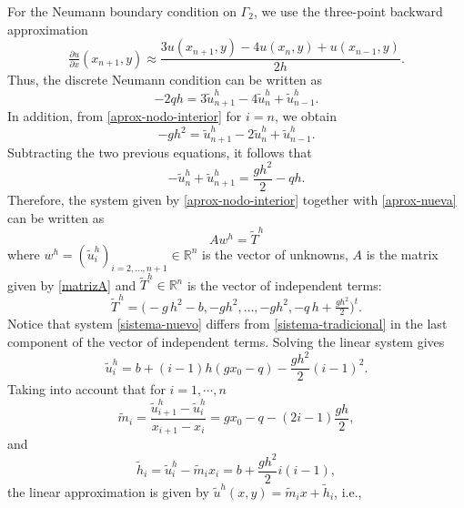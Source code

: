 \documentclass[11pt]{article}
\newcommand\pder[2][]{\ensuremath{\tfrac{\partial#1}{\partial#2}}}
\begin{document}
For the Neumann boundary condition on $\Gamma_2$, we use the three-point backward \mbox{approximation}
\begin{equation}\label{aprox-Neumann-nueva}
\pder[u]{x}(x_{n+1},y)\approx \frac{3u(x_{n+1},y)-4u(x_n,y)+u(x_{n-1},y)}{2h}.
\end{equation}
Thus, the discrete Neumann condition can be written as
\begin{equation}
-2 q h = {
3\widetilde{u}^{h}_{n+1}
-4\widetilde{u}^{h}_{n}
+\widetilde{u}^{h}_{n-1}}.
\end{equation}
In addition, from \eqref{aprox-nodo-interior} for $i=n$, we obtain
\begin{equation}
-gh^2 = {\widetilde{u}^h_{n+1}-2\widetilde{u}^h_n+\widetilde{u}^h_{n-1}.}
\end{equation}
Subtracting the two previous equations, it follows that
\begin{equation}\label{aprox-nueva}
{-\widetilde{u}^h_n+\widetilde{u}^h_{n+1}}=\frac{gh^2}{2}-qh.
\end{equation}
Therefore, the system given by \eqref{aprox-nodo-interior} together with \eqref{aprox-nueva} can be written  as
\begin{equation}\label{sistema-nuevo}
{A w^h=\widetilde{T}^h}
\end{equation}
where $w^h = ({\widetilde{u}^h_i})_{i=2,\ldots,n+1}\in\mathbb{R}^{n}$ is the vector of unknowns, $A$ is the matrix given by \eqref{matrizA} and   ${\widetilde{T}^h}\in \mathbb{R}^n$ is the vector of independent terms:
    \begin{equation}\label{vectorT*}
     {\widetilde{T}^h}= \Big(-g\,h^2 - b, -g h^2, \ldots, -g h^2, -q\,h +\tfrac{gh^2}{2} \Big)^t.
\end{equation}
Notice that system \eqref{sistema-nuevo} differs from \eqref{sistema-tradicional} in the last component of the vector of independent terms.
Solving the linear system gives
\begin{equation}
{\widetilde{u}^h_i}=b+(i-1)h(gx_0-q)-\frac{gh^2}{2}(i-1)^2.
\end{equation}
Taking into account that for $i=1,\cdots, n$
\begin{equation}
\widetilde{m}_i={\frac{\widetilde{u}^h_{i+1}-\widetilde{u}^h_{i}}{x_{i+1}-x_i}}=gx_0-q-(2i-1)\frac{gh}{2},
\end{equation}
and
\begin{equation}
\widetilde{h}_i= {\widetilde{u}^h_i-\widetilde{m}_i x_i}= b+\frac{gh^2}{2} i (i-1),
\end{equation}
the linear approximation is given by ${\widetilde{u}^h}(x,y)=\widetilde{m}_i x+\widetilde{h}_i$, i.e.,
\end{document}
